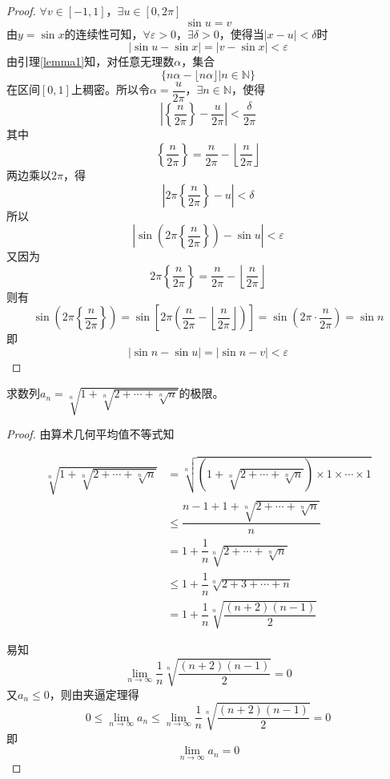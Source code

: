 \begin{proof}

    $\forall v \in [-1, 1]$，$\exists u \in [0, 2\pi]$
    $$\sin{u} = v$$
    由$y = \sin{x}$的连续性可知，$\forall \varepsilon > 0$，$\exists \delta > 0$，使得当$|x - u| < \delta$时
    $$| \sin{u} - \sin{x} | = | v - \sin{x} | < \varepsilon$$
    由引理\ref{lemma1}知，对任意无理数$\alpha$，集合
    $$\{n\alpha - \lfloor n\alpha \rfloor \big| n \in \mathbb{N}\}$$
    在区间$[0, 1]$上稠密。所以令$\alpha = \dfrac{u}{2\pi}$，$\exists n \in \mathbb{N}$，使得
    $$\left| \left \{\dfrac{n}{2\pi} \right\} - \dfrac{u}{2\pi} \right| < \dfrac{\delta}{2\pi}$$
    其中
    $$\left \{\dfrac{n}{2\pi} \right\} = \dfrac{n}{2\pi} - \left\lfloor \dfrac{n}{2\pi} \right\rfloor$$
    两边乘以$2\pi$，得
    $$\left|  2\pi \left \{\dfrac{n}{2\pi} \right\} - u \right| < \delta$$
    所以
    $$\left| \sin{\left(2\pi \left \{\dfrac{n}{2\pi} \right\} \right)} - \sin{u} \right| < \varepsilon$$
    又因为
    $$2\pi \left \{\dfrac{n}{2\pi} \right\} = \dfrac{n}{2\pi} - \left\lfloor \dfrac{n}{2\pi} \right\rfloor$$
    则有
    $$\sin{\left(2\pi \left \{\dfrac{n}{2\pi} \right\} \right)} = \sin{\left[2\pi \left( \dfrac{n}{2\pi} - \left\lfloor \dfrac{n}{2\pi} \right\rfloor \right)\right]} = \sin{\left(2\pi \cdot \dfrac{n}{2\pi}\right)} = \sin{n}$$
    即
    $$|\sin{n} - \sin{u}| = |\sin{n} - v| < \varepsilon$$

\end{proof}

\begin{proposition}

    求数列$a_n = \sqrt[n]{1 + \sqrt[n]{2 + \cdots + \sqrt[n]{n}}}$的极限。

\end{proposition}

\begin{proof}

    由算术几何平均值不等式知

    \begin{align*}
        \sqrt[n]{1 + \sqrt[n]{2 + \cdots + \sqrt[n]{n}}} & = \sqrt[n]{\left(1 + \sqrt[n]{2 + \cdots + \sqrt[n]{n}}\right) \times 1 \times \cdots \times 1} \\
        & \leq \dfrac{n - 1 + 1 + \sqrt[n]{2 + \cdots + \sqrt[n]{n}}}{n} \\
        & = 1 + \dfrac{1}{n} \sqrt[n]{2 + \cdots + \sqrt[n]{n}} \\
        & \leq 1 + \dfrac{1}{n} \sqrt[n]{2 + 3 + \cdots + n} \\
        & = 1 + \dfrac{1}{n} \sqrt[n]{\dfrac{(n + 2)(n - 1)}{2}}
    \end{align*}

    易知
    $$\lim\limits_{n\to\infty}{\dfrac{1}{n} \sqrt[n]{\dfrac{(n + 2)(n - 1)}{2}}} = 0$$
    又$a_n \leq 0$，则由夹逼定理得
    $$0 \leq \lim\limits_{n\to\infty}{a_n} \leq \lim\limits_{n\to\infty}{\dfrac{1}{n} \sqrt[n]{\dfrac{(n + 2)(n - 1)}{2}}} = 0$$
    即
    $$\lim\limits_{n\to\infty}{a_n} = 0$$
    
\end{proof}

